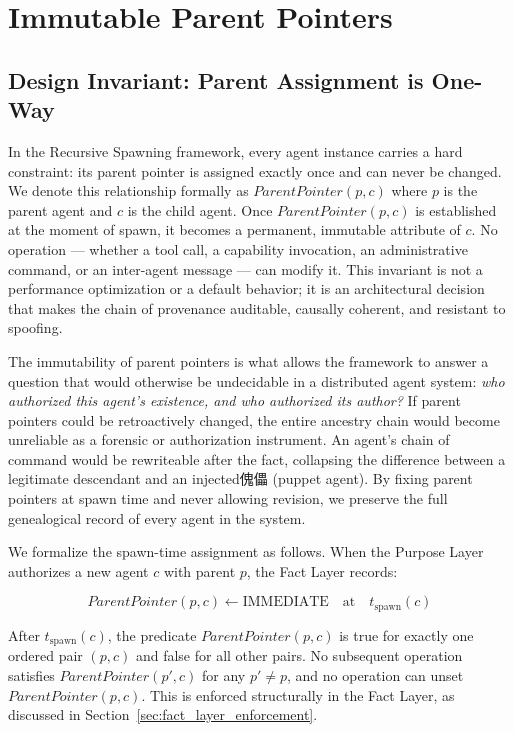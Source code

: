 \section{Immutable Parent Pointers}

\subsection{Design Invariant: Parent Assignment is One-Way}

In the Recursive Spawning framework, every agent instance carries a hard constraint: its parent pointer is assigned exactly once and can never be changed. We denote this relationship formally as $\textit{ParentPointer}(p, c)$ where $p$ is the parent agent and $c$ is the child agent. Once $\textit{ParentPointer}(p, c)$ is established at the moment of spawn, it becomes a permanent, immutable attribute of $c$. No operation — whether a tool call, a capability invocation, an administrative command, or an inter-agent message — can modify it. This invariant is not a performance optimization or a default behavior; it is an architectural decision that makes the chain of provenance auditable, causally coherent, and resistant to spoofing.

The immutability of parent pointers is what allows the framework to answer a question that would otherwise be undecidable in a distributed agent system: \emph{who authorized this agent's existence, and who authorized its author?} If parent pointers could be retroactively changed, the entire ancestry chain would become unreliable as a forensic or authorization instrument. An agent's chain of command would be rewriteable after the fact, collapsing the difference between a legitimate descendant and an injected傀儡 (puppet agent). By fixing parent pointers at spawn time and never allowing revision, we preserve the full genealogical record of every agent in the system.

We formalize the spawn-time assignment as follows. When the Purpose Layer authorizes a new agent $c$ with parent $p$, the Fact Layer records:

\[
\textit{ParentPointer}(p, c) \gets \text{IMMEDIATE} \quad \text{at} \quad t_{\text{spawn}}(c)
\]

After $t_{\text{spawn}}(c)$, the predicate $\textit{ParentPointer}(p, c)$ is true for exactly one ordered pair $(p, c)$ and false for all other pairs. No subsequent operation satisfies $\textit{ParentPointer}(p', c)$ for any $p' \neq p$, and no operation can unset $\textit{ParentPointer}(p, c)$. This is enforced structurally in the Fact Layer, as discussed in Section~\ref{sec:fact_layer_enforcement}.

